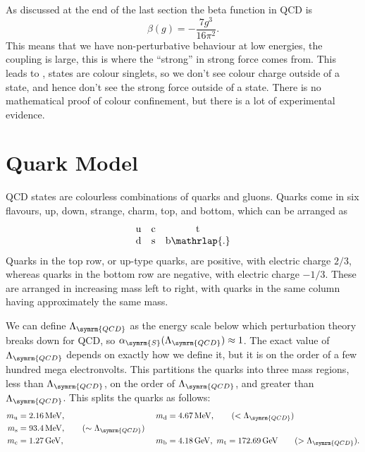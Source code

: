 \documentclass[fleqn]{NotesClass}
\newcommand{\Pparticle}[1]{\mathrm{#1}}
\newcommand{\Pu}{\ensuremath{\Pparticle{u}}}
\newcommand{\Pd}{\ensuremath{\Pparticle{d}}}
\newcommand{\Ps}{\ensuremath{\Pparticle{s}}}
\newcommand{\Pc}{\ensuremath{\Pparticle{c}}}
\newcommand{\Pt}{\ensuremath{\Pparticle{t}}}
\newcommand{\Pb}{\ensuremath{\Pparticle{b}}}
\newcommand{\strongCoupling}{\alpha_{\symrm{S}}}
\begin{document}
    As discussed at the end of the last section the beta function in QCD is
    \begin{equation}
        \beta(g) = -\frac{7g^3}{16\pi^2}.
    \end{equation}
    This means that we have non-perturbative behaviour at low energies, the coupling is large, this is where the \enquote{strong} in strong force comes from.
    This leads to , states are colour singlets, so we don't see colour charge outside of a state, and hence don't see the strong force outside of a state.
    There is no mathematical proof of colour confinement, but there is a lot of experimental evidence.
    
    \section{Quark Model}
    QCD states are colourless combinations of quarks and gluons.
    Quarks come in six flavours, up, down, strange, charm, top, and bottom, which can be arranged as
    \begin{equation}
        \begin{array}{ccc}
            \Pu & \Pc & \Pt\\
            \Pd & \Ps & \Pb\mathrlap{.}
        \end{array}
    \end{equation}
    Quarks in the top row, or up-type quarks, are positive, with electric charge \(2/3\), whereas quarks in the bottom row are negative, with electric charge \(-1/3\).
    These are arranged in increasing mass left to right, with quarks in the same column having approximately the same mass.
    
    We can define \(\Lambda_{\symrm{QCD}}\) as the energy scale below which perturbation theory breaks down for QCD, so \(\strongCoupling(\Lambda_{\symrm{QCD}}) \approx 1\).
    The exact value of \(\Lambda_{\symrm{QCD}}\) depends on exactly how we define it, but it is on the order of a few hundred mega electronvolts.
    This partitions the quarks into three mass regions, less than \(\Lambda_{\symrm{QCD}}\), on the order of \(\Lambda_{\symrm{QCD}}\), and greater than \(\Lambda_{\symrm{QCD}}\).
    This splits the quarks as follows:
    \begin{alignat}{3}
        m_{\Pu} &= \qty{2.16}{\mega\electronvolt}, &\  m_{\Pd} &= \qty{4.67}{\mega\electronvolt}, \tag{\(< \Lambda_{\symrm{QCD}}\)}\\
        m_{\Ps} &= \qty{93.4}{\mega\electronvolt}, \tag{\(\sim \Lambda_{\symrm{QCD}}\)}\\
        m_{\Pc} &= \qty{1.27}{\giga\electronvolt},\  & m_{\Pb} &= \qty{4.18}{\giga\electronvolt}, \ m_{\Pt} = \qty{172.69}{\giga\electronvolt} \tag{\(> \Lambda_{\symrm{QCD}}\)}.
    \end{alignat}
    
\end{document}
